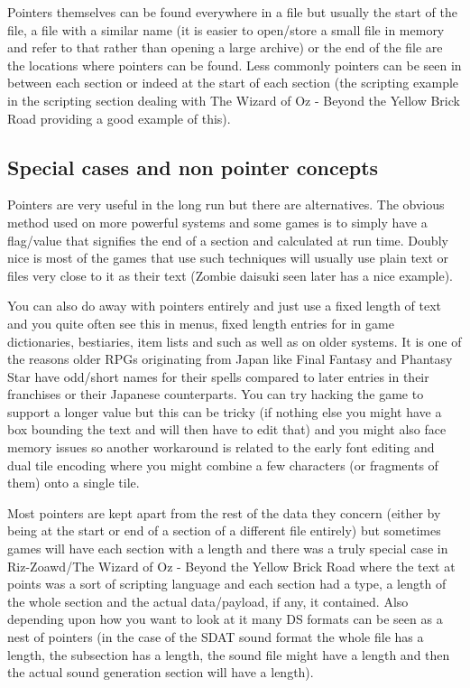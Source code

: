 \documentclass[
]{book}
\begin{document}
Pointers themselves can be found everywhere in a file but usually the start of the file, a file with a similar name (it is easier to open/store a small file in memory and refer to that rather than opening a large archive) or the end of the file are the locations where pointers can be found. Less commonly pointers can be seen in between each section or indeed at the start of each section (the scripting example in the scripting section dealing with The Wizard of Oz - Beyond the Yellow Brick Road providing a good example of this).

\hypertarget{special-cases-and-non-pointer-concepts}{%
\subsection{Special cases and non pointer concepts}\label{special-cases-and-non-pointer-concepts}}

Pointers are very useful in the long run but there are alternatives. The obvious method used on more powerful systems and some games is to simply have a flag/value that signifies the end of a section and calculated at run time. Doubly nice is most of the games that use such techniques will usually use plain text or files very close to it as their text (Zombie daisuki seen later has a nice example).

You can also do away with pointers entirely and just use a fixed length of text and you quite often see this in menus, fixed length entries for in game dictionaries, bestiaries, item lists and such as well as on older systems. It is one of the reasons older RPGs originating from Japan like Final Fantasy and Phantasy Star have odd/short names for their spells compared to later entries in their franchises or their Japanese counterparts. You can try hacking the game to support a longer value but this can be tricky (if nothing else you might have a box bounding the text and will then have to edit that) and you might also face memory issues so another workaround is related to the early font editing and dual tile encoding where you might combine a few characters (or fragments of them) onto a single tile.

Most pointers are kept apart from the rest of the data they concern (either by being at the start or end of a section of a different file entirely) but sometimes games will have each section with a length and there was a truly special case in Riz-Zoawd/The Wizard of Oz - Beyond the Yellow Brick Road where the text at points was a sort of scripting language and each section had a type, a length of the whole section and the actual data/payload, if any, it contained. Also depending upon how you want to look at it many DS formats can be seen as a nest of pointers (in the case of the SDAT sound format the whole file has a length, the subsection has a length, the sound file might have a length and then the actual sound generation section will have a length).
\end{document}
